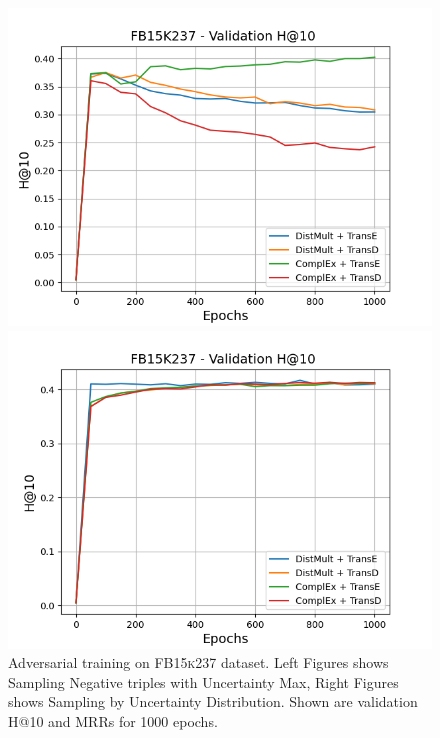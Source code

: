 \begin{figure}
    \begin{minipage}{.5\textwidth}
      \centering
      \includegraphics[width=0.9\linewidth]{figures/results/gan_train/not_pretrained/uncertainty/max/entropy/fb15k237/uncertainty_fb15k237_hit10.png}
    \end{minipage}%
    \begin{minipage}{.5\textwidth}
      \centering
      \includegraphics[width=0.9\linewidth]{figures/results/gan_train/not_pretrained/uncertainty/max_distribution/entropy/fb15k237/uncertainty_fb15k237_hit10.png}
    \end{minipage}%
    \caption{Adversarial training on \textsc{FB15k237} dataset. 
    Left Figures shows Sampling Negative triples with Uncertainty Max, Right Figures shows Sampling by Uncertainty Distribution.
    Shown are validation H@10 and MRRs for 1000 epochs.}
    \label{fig:advtrain_not_pretrained_fb15k237_pretrained}
\end{figure}




